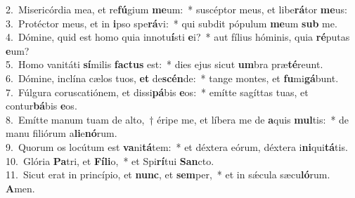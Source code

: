 {2.~}Misericórdia mea, et re\textbf{fú}gium \textbf{me}um:~* suscéptor meus, et libe\textbf{rá}tor \textbf{me}us:\\
{3.~}Protéctor meus, et in \textbf{i}pso spe\textbf{rá}vi:~* qui subdit pópulum \textbf{me}um \textbf{sub} me.\\
{4.~}Dómine, quid est homo quia innotu\textbf{í}sti \textbf{e}i?~* aut fílius hóminis, quia \textbf{ré}putas \textbf{e}um?\\
{5.~}Homo vanitáti \textbf{sí}milis \textbf{fa}\textbf{ctus} est:~* dies ejus sicut \textbf{um}bra præ\textbf{té}reunt.\\
{6.~}Dómine, inclína cælos tuos, \textbf{et} de\textbf{scén}de:~* tange montes, et \textbf{fu}mi\textbf{gá}bunt.\\
{7.~}Fúlgura coruscatiónem, et dissi\textbf{pá}bis \textbf{e}os:~* emítte sagíttas tuas, et contur\textbf{bá}bis \textbf{e}os.\\
{8.~}Emítte manum tuam de alto,~† éripe me, et líbera me de \textbf{a}quis \textbf{mul}tis:~* de manu filiórum a\textbf{li}e\textbf{nó}rum.\\
{9.~}Quorum os locútum est \textbf{va}ni\textbf{tá}tem:~* et déxtera eórum, déxtera i\textbf{ni}qui\textbf{tá}tis.\\
{10.~}Glória \textbf{Pa}tri, et \textbf{Fí}\textbf{li}o,~* et Spi\textbf{rí}tui \textbf{San}cto.\\
{11.~}Sicut erat in princípio, et \textbf{nunc}, et \textbf{sem}per,~* et in sǽcula sæcu\textbf{ló}rum. \textbf{A}men.\\
